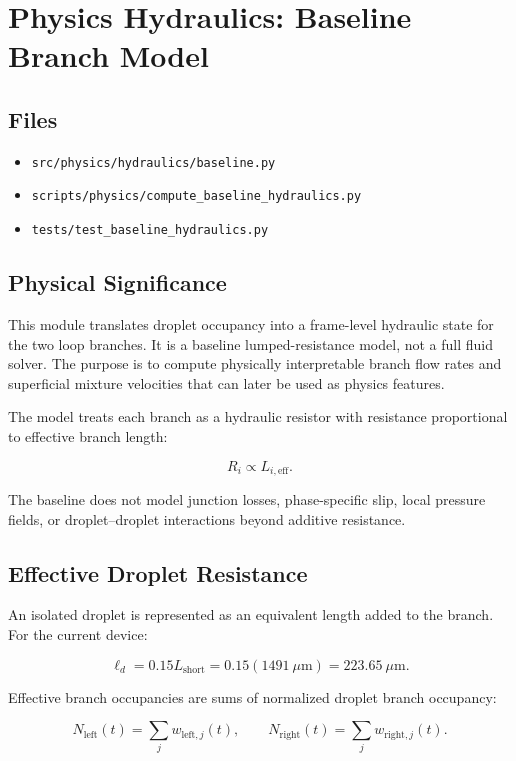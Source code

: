 \section{Physics Hydraulics: Baseline Branch Model}

\subsection{Files}

\begin{itemize}
  \item \texttt{src/physics/hydraulics/baseline.py}
  \item \texttt{scripts/physics/compute\_baseline\_hydraulics.py}
  \item \texttt{tests/test\_baseline\_hydraulics.py}
\end{itemize}

\subsection{Physical Significance}

This module translates droplet occupancy into a frame-level hydraulic state for
the two loop branches. It is a baseline lumped-resistance model, not a full
fluid solver. The purpose is to compute physically interpretable branch flow
rates and superficial mixture velocities that can later be used as physics
features.

The model treats each branch as a hydraulic resistor with resistance
proportional to effective branch length:

\[
R_i \propto L_{i,\mathrm{eff}}.
\]

The baseline does not model junction losses, phase-specific slip, local
pressure fields, or droplet--droplet interactions beyond additive resistance.

\subsection{Effective Droplet Resistance}

An isolated droplet is represented as an equivalent length added to the branch.
For the current device:

\[
\ell_d = 0.15 L_{\mathrm{short}}
= 0.15(1491~\mu\mathrm{m})
= 223.65~\mu\mathrm{m}.
\]

Effective branch occupancies are sums of normalized droplet branch occupancy:

\[
N_{\mathrm{left}}(t) = \sum_j w_{\mathrm{left},j}(t),
\qquad
N_{\mathrm{right}}(t) = \sum_j w_{\mathrm{right},j}(t).
\]

